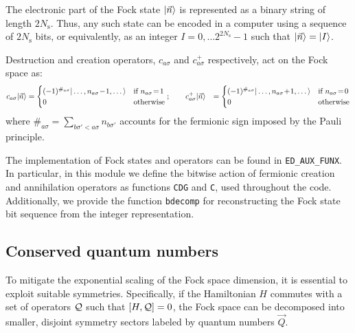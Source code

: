 \documentclass[edipack2.tex]{subfiles}
\begin{document}
The electronic part of the Fock state $|\vec{n}\rangle$ is represented
as a binary string of length $2N_\mathrm{s}$. Thus, any such state can be encoded
in a computer using a sequence of $2N_\mathrm{s}$ bits, or equivalently, as an integer $I=0,\dots 2^{2N_\mathrm{s}}-1$ such that $|\vec{n}\rangle=|I\rangle$.  

Destruction and creation operators, $c_{a\sigma}$ and $c^+_{a\sigma}$ 
respectively, act on the Fock space as:
\begin{align*}
  c_{a\sigma}\ket{\vec{n}} &=
    \begin{cases}
      (-1)^{\#_{a\sigma}}\ket{\dots,n_{a\sigma}\!-\!1,\dots}
      &\text{if $n_{a\sigma}\!=\! 1$}\\
      0 &\text{otherwise}
    \end{cases};\qquad
    c^{+}_{a\sigma}\ket{\vec{n}} &=
     \begin{cases}
      (-1)^{\#_{a\sigma}}\ket{\dots,n_{a\sigma}\!+\!1,\dots}
      & \text{if $n_{a\sigma}\!=\! 0$}\\
      0 & \text{otherwise}
    \end{cases}    
\end{align*}
where $\#_{a\sigma}=\sum_{b\sigma'<a\sigma} n_{b\sigma'}$ accounts for the fermionic sign imposed by the Pauli principle.


The implementation of Fock states and operators can be found in 
{\tt ED\_AUX\_FUNX}. In particular, in this module we define the bitwise action 
of fermionic creation and annihilation operators as functions 
{\tt CDG} and {\tt C}, used throughout the code. Additionally, 
we provide the function {\tt bdecomp} for reconstructing the Fock 
state bit sequence from the integer representation.



















\subsection{Conserved quantum numbers}\label{sSecQNs}
To mitigate the exponential scaling of the Fock space dimension, it 
is essential to exploit suitable symmetries. Specifically, if the 
Hamiltonian $H$ commutes with a set of operators ${\cal Q}$ such that 
$[H, {\cal Q}] = 0$, the Fock space can be decomposed into smaller, 
disjoint symmetry sectors labeled by quantum numbers $\vec{Q}$.
\end{document}
